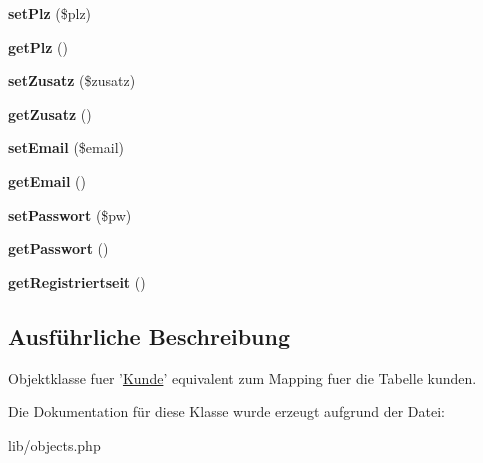 \begin{DoxyCompactItemize}
\item 
\hypertarget{classKunde_ac77b9f03709bac5d0fdf51af6c5d9506}{{\bfseries set\-Plz} (\$plz)}\label{classKunde_ac77b9f03709bac5d0fdf51af6c5d9506}

\item 
\hypertarget{classKunde_a9fba8370e41ff890f87a95d4d467e684}{{\bfseries get\-Plz} ()}\label{classKunde_a9fba8370e41ff890f87a95d4d467e684}

\item 
\hypertarget{classKunde_a46ef3694829f44f131e5c13b6e82b808}{{\bfseries set\-Zusatz} (\$zusatz)}\label{classKunde_a46ef3694829f44f131e5c13b6e82b808}

\item 
\hypertarget{classKunde_a90e98d3440a64d9883e78dc93a469e66}{{\bfseries get\-Zusatz} ()}\label{classKunde_a90e98d3440a64d9883e78dc93a469e66}

\item 
\hypertarget{classKunde_a750f29ac8456a1de5844423795f2f3bc}{{\bfseries set\-Email} (\$email)}\label{classKunde_a750f29ac8456a1de5844423795f2f3bc}

\item 
\hypertarget{classKunde_af880094791a185aafe1556c1b19c3e0e}{{\bfseries get\-Email} ()}\label{classKunde_af880094791a185aafe1556c1b19c3e0e}

\item 
\hypertarget{classKunde_acf257c68e9212322ba4e66f753c5da24}{{\bfseries set\-Passwort} (\$pw)}\label{classKunde_acf257c68e9212322ba4e66f753c5da24}

\item 
\hypertarget{classKunde_a271f13f3690fb10213d08c5365700ae1}{{\bfseries get\-Passwort} ()}\label{classKunde_a271f13f3690fb10213d08c5365700ae1}

\item 
\hypertarget{classKunde_af99f38bcde53d559fc99c59fbc55eaa1}{{\bfseries get\-Registriertseit} ()}\label{classKunde_af99f38bcde53d559fc99c59fbc55eaa1}

\end{DoxyCompactItemize}


\subsection{\-Ausführliche \-Beschreibung}
\-Objektklasse fuer '\hyperlink{classKunde}{\-Kunde}' equivalent zum \-Mapping fuer die \-Tabelle kunden. 

\-Die \-Dokumentation für diese \-Klasse wurde erzeugt aufgrund der \-Datei\-:\begin{DoxyCompactItemize}
\item 
lib/objects.\-php\end{DoxyCompactItemize}
